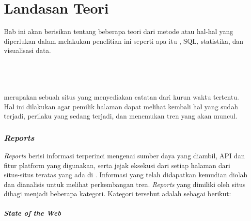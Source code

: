\chapter{Landasan Teori}
\label{chap:teori}

Bab ini akan berisikan tentang beberapa teori dari metode atau hal-hal yang diperlukan dalam melakukan penelitian ini seperti apa itu \http, SQL, statistika, dan visualisasi data.

\section{\http~\cite{httpreports}}
\label{sec:httparchive} 

\http merupakan sebuah situs \web yang menyediakan catatan dari kurun waktu tertentu. Hal ini dilakukan agar pemilik halaman \web dapat melihat kembali hal yang sudah terjadi, perilaku yang sedang terjadi, dan menemukan tren yang akan muncul.

 
\subsection{\textit{Reports}}
\label{subsec:reports}

\textit{Reports} berisi informasi terperinci mengenai sumber daya yang diambil, API dan fitur platform yang digunakan, serta jejak eksekusi dari setiap halaman dari situs-situs teratas yang ada di \web. Informasi yang telah didapatkan kemudian diolah dan dianalisis untuk melihat perkembangan tren. \textit{Reports} yang dimiliki oleh situs \http dibagi menjadi beberapa kategori. Kategori tersebut adalah sebagai berikut:

\subsubsection{\textit{State of the Web}} 
\label{subsub:StateWeb}

